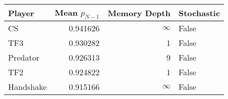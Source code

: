 \begin{tabular}{lrrl}
\toprule
    Player &  Mean $p_{N-1}$ &  Memory Depth & Stochastic \\
\midrule
        CS &        0.941626 &            \(\infty\) &      False \\
       TF3 &        0.930282 &             1 &      False \\
  Predator &        0.926313 &             9 &      False \\
       TF2 &        0.924822 &             1 &      False \\
 Handshake &        0.915166 &            \(\infty\) &      False \\
\bottomrule
\end{tabular}
